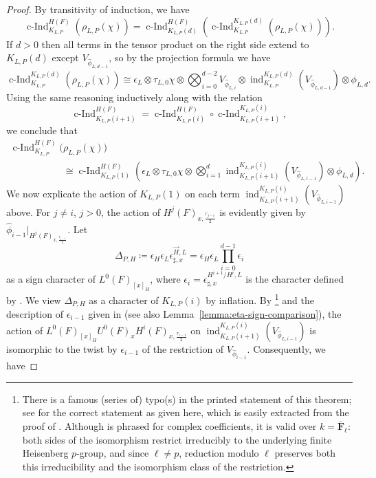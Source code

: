 \documentclass[reqno]{amsart}
\numberwithin{equation}{subsection}
\newcommand{\F}{\mathbf{F}}
\newcommand{\ol}[1]{\overline{#1}}
\newcommand{\wh}[1]{\widehat{#1}}
\DeclareMathOperator{\ind}{ind}
\DeclareMathOperator{\cInd}{c-Ind}
\theoremstyle{remark}
\numberwithin{equation}{subsection}
\numberwithin{figure}{subsection}
\begin{document}
\begin{proof}
By transitivity of induction, we have
\[
\cInd_{K_{L,P}}^{H(F)}(\rho_{L,P}(\chi)) = \cInd_{K_{L,P}(d)}^{H(F)}(\cInd_{K_{L,P}}^{K_{L,P}(d)}(\rho_{L,P}(\chi))).
\]
If $d > 0$ then all terms in the tensor product on the right side extend to $K_{L,P}(d)$ except $V_{\wh\phi_{L,d-1}}$, so by the projection formula we have
\[
\cInd_{K_{L,P}}^{K_{L,P}(d)}(\rho_{L,P}(\chi)) \cong \epsilon_L \otimes \tau_{L,0}\chi \otimes \bigotimes_{i=0}^{d-2} V_{\wh\phi_{L,i}} \otimes \ind_{K_{L,P}}^{K_{L,P}(d)}(V_{\wh\phi_{L,d-1}}) \otimes \phi_{L,d}.
\]
Using the same reasoning inductively along with the relation 
\[
\cInd_{K_{L,P}(i+1)}^{H(F)} = \cInd_{K_{L,P}(i)}^{H(F)} \circ \cInd_{K_{L,P}(i+1)}^{K_{L,P}(i)},
\]
we conclude that
\begin{align}\label{eq:KP1-induction}
\cInd_{K_{L,P}}^{H(F)}(&\rho_{L,P}(\chi)) \nonumber \\
&\cong \cInd_{K_{L,P}(1)}^{H(F)}\left(\epsilon_L \otimes \tau_{L,0}\chi \otimes \bigotimes_{i=1}^{d} \ind_{K_{L,P}(i+1)}^{K_{L,P}(i)}(V_{\wh\phi_{L,i-1}}) \otimes \phi_{L,d}\right).
\end{align}
We now explicate the action of $K_{L,P}(1)$ on each term $\ind_{K_{L,P}(i+1)}^{K_{L,P}(i)}(V_{\wh\phi_{L,i-1}})$ above. For $j \neq i$, $j > 0$, the action of $H^j(F)_{x,\frac{r_{j-1}}{2}}$ is evidently given by $\wh\phi_{i-1}|_{H^j(F)_{x,\frac{r_{j-1}}{2}}}$. Let
\[
\Delta_{P,H}\coloneqq \epsilon_H\epsilon_L\epsilon_{\sharp,x}^{\vec H, L} =
\epsilon_H\epsilon_L\prod_{i=0}^{d-1}\epsilon_i
\]
as a sign character of $L^0(F)_{[x]_H}$, where $\epsilon_i = \epsilon_{\sharp,x}^{H^{i+1}/H^i,L}$ is the character defined by \cite[Lemma~3.2.2]{CF26a}. We view $\Delta_{P,H}$ as a character of $K_{L,P}(i)$ by inflation.
By \cite[Theorem 2.4(b)]{Ger77}\footnote{There is a famous (series of) typo(s) in the printed statement of this theorem; see \cite[Footnote 1 on page 2]{Fin21b} for the correct statement as given here, which is easily extracted from the proof of \cite[Theorem 2.4(b)]{Ger77}. Although \cite[Theorem 2.4(b)]{Ger77} is phrased for complex coefficients, it is valid over $k = \ol \F_\ell$: both sides of the isomorphism restrict irreducibly to the underlying finite Heisenberg $p$-group, and since $\ell\neq p$, reduction modulo $\ell$ preserves both this irreducibility and the isomorphism class of the restriction.} and the description of $\epsilon_{i-1}$ given in \cite[Lemma~3.2.2]{CF26a} (see also Lemma~\ref{lemma:eta-sign-comparison}), the action of $L^0(F)_{[x]_H}U^0(F)_x H^i(F)_{x,\frac{r_{i-1}}{2}}$ on $\ind_{K_{L,P}(i+1)}^{K_{L,P}(i)}(V_{\wh\phi_{L,i-1}})$ is isomorphic to the twist by $\epsilon_{i-1}$ of the restriction of $V_{\wh\phi_{i-1}}$. Consequently, we have

\end{proof}
\end{document}
